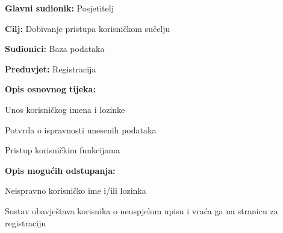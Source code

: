 					\noindent {}
					\begin{packed_item}
						
						\item \textbf{Glavni sudionik: } Posjetitelj
						\item  \textbf{Cilj:}  Dobivanje pristupa korisničkom sučelju
						\item  \textbf{Sudionici:}  Baza podataka
						\item  \textbf{Preduvjet:}  Registracija
						\item  \textbf{Opis osnovnog tijeka:}
						
						\item[] \begin{packed_enum}
							
							\item  Unos korisničkog imena i lozinke
							\item  Potvrda o ispravnosti unesenih podataka
							\item  Pristup korisničkim funkcijama
						\end{packed_enum}
						
						\item  \textbf{Opis mogućih odstupanja:}
						
						\item[] \begin{packed_item}
							
							\item[2.a]  Neispravno korisničko ime i/ili lozinka
							\item[] \begin{packed_enum}
								
								\item  Sustav obavještava korisnika o neuspjelom upisu i 
								vraća ga na stranicu za registraciju
								
							\end{packed_enum}							
							
						\end{packed_item}
					\end{packed_item}
					
